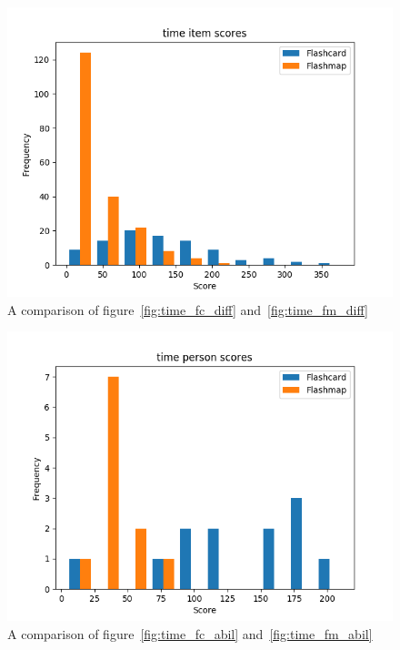 \begin{figure}
    \centering
    \includegraphics[width=.7\textwidth]{img/time_diff.png}
    \caption{A comparison of figure~\protect\ref{fig:time_fc_diff} and~\protect\ref{fig:time_fm_diff}}
    \label{fig:time_diff}
\end{figure}
\begin{figure}
    \centering
    \includegraphics[width=.7\textwidth]{img/time_abil.png}
    \caption{A comparison of figure~\protect\ref{fig:time_fc_abil} and~\protect\ref{fig:time_fm_abil}}
    \label{fig:time_abil}
\end{figure}
